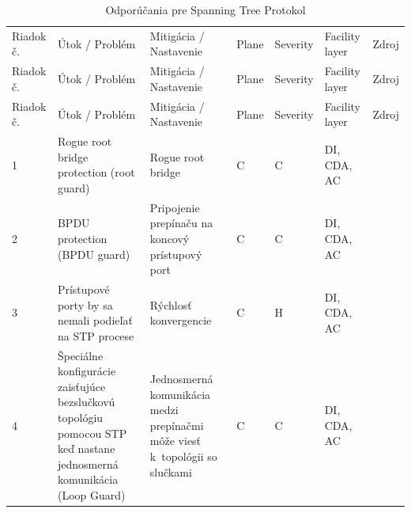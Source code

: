 \begin{longtable}[!htbp]{|C{2.5em}L{11em}L{11em}C{2.5em}C{4em}C{5em}L{2.5em}|}
	
	\caption{Odporúčania pre Spanning Tree Protokol}
	\label{tab:stp}\\ \hline
	\mbox{Riadok} č.&Útok / Problém	&Mitigácia / Nastavenie	&Plane	&Severity	&Facility layer	&Zdroj\\ \hhline{=======}
	\endfirsthead 
	\hline
	\centering
	
	Riadok č.	&Útok / Problém	&Mitigácia / Nastavenie	&Plane	&Severity	&Facility layer	&Zdroj\\ \hhline{=======}
	\endhead
	
	Riadok č.	&Útok / Problém	&Mitigácia / Nastavenie	&Plane	&Severity	&Facility layer	&Zdroj\\
	\endhead
	
	 1	&Rogue root bridge protection (root guard)	&Rogue root bridge 	&C	&C	&DI,
	CDA,
	AC	& \cite{Vyncke2008}\\
	2	&BPDU protection (BPDU guard)	&Pripojenie prepínaču na koncový prístupový port	&C	&C	&DI,
	CDA,
	AC	& \cite{Vyncke2008}\\
	 3	&Prístupové porty by sa nemali podieľať na STP procese	&Rýchlosť konvergencie	&C	&H	&DI,
	CDA,
	AC	& \cite{Vyncke2008}\\
	4	&Špeciálne konfigurácie zaisťujúce bezslučkovú topológiu pomocou STP keď nastane jednosmerná komunikácia (Loop Guard)	&Jednosmerná komunikácia medzi prepínačmi môže viesť k~topológii so slučkami	&C	&C	&DI,
	CDA,
	AC	& \cite{Tiso2012}\\
	
	\hline
	
\end{longtable}%


